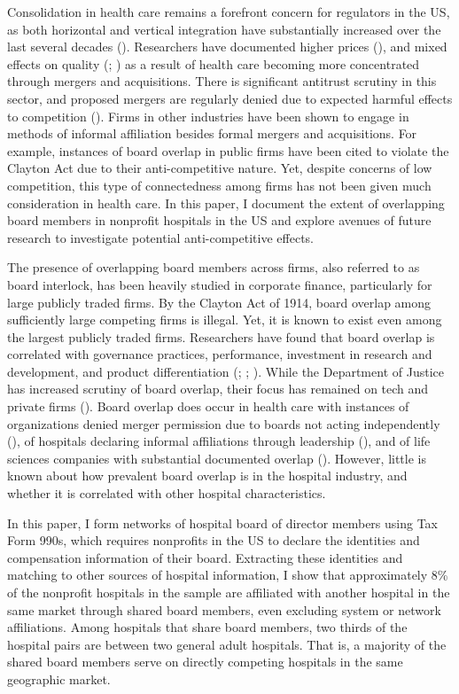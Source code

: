 \documentclass[12pt]{article}
\begin{document}
    Consolidation in health care remains a forefront concern for regulators in the US, as both horizontal and vertical integration have substantially increased over the last several decades (\cite{levinson2024ten}). Researchers have documented higher prices (\cite{brot2024pays}), and mixed effects on quality (\cite{kessler2000hospital}; \cite{cooper2011does}) as a result of health care becoming more concentrated through mergers and acquisitions. There is significant antitrust scrutiny in this sector, and proposed mergers are regularly denied due to expected harmful effects to competition (\cite{Meyer2022}). Firms in other industries have been shown to engage in methods of informal affiliation besides formal mergers and acquisitions. For example, instances of board overlap in public firms have been cited to violate the Clayton Act due to their anti-competitive nature. Yet, despite concerns of low competition, this type of connectedness among firms has not been given much consideration in health care. In this paper, I document the extent of overlapping board members in nonprofit hospitals in the US and explore avenues of future research to investigate 
    potential anti-competitive effects.

    The presence of overlapping board members across firms, also referred to as board interlock, has been heavily studied in corporate finance, particularly for large publicly traded firms. By the Clayton Act of 1914, board overlap among sufficiently large competing firms is illegal. Yet, it is known to exist even among the largest publicly traded firms. Researchers have found that board overlap is correlated with governance practices, performance, investment in research and development, and product differentiation (\cite{cai2014board}; \cite{lamb2016ties}; \cite{geng2021does}). While the Department of Justice has increased scrutiny of board overlap, their focus has remained on tech and private firms (\cite{Morse2023}). Board overlap does occur in health care with instances of organizations denied merger permission due to boards not acting independently (\cite{huberfeld2006tackling}), of hospitals declaring informal affiliations through leadership (\cite{barnett_babcock_2012}), and of life sciences companies with substantial documented overlap (\cite{manjunath2024illegal}). However, little is known about how prevalent board overlap is in the hospital industry, and whether it is correlated with other hospital characteristics. 

    In this paper, I form networks of hospital board of director members using Tax Form 990s, which requires nonprofits in the US to declare the identities and compensation information of their board. Extracting these identities and matching to other sources of hospital information, I show that approximately 8\% of the nonprofit hospitals in the sample are affiliated with another hospital in the same market through shared board members, even excluding system or network affiliations. Among hospitals that share board members, two thirds of the hospital pairs are between two general adult hospitals. That is, a majority of the shared board members serve on directly competing hospitals in the same geographic market. 
\end{document}
